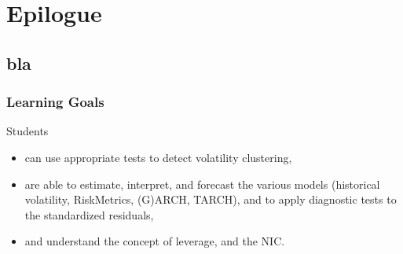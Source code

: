 \section{Epilogue}\subsection*{bla}
\begin{frame}\frametitle{Learning Goals}
Students
\begin{itemize}
\item can use appropriate tests to detect volatility clustering,
\item are able to estimate, interpret, and forecast the various models (historical volatility, RiskMetrics, (G)ARCH, TARCH),
and to apply diagnostic tests to the standardized residuals,
\item and understand the concept of leverage, and the NIC.

\end{itemize}

\end{frame}




